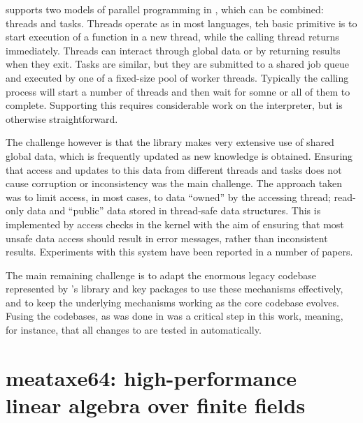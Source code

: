 \documentclass{deliverablereport}
\begin{document}
\HPCGAP supports two models of parallel programming in \GAP, which can
be combined: threads and tasks. Threads operate as in most languages,
teh basic primitive is to start execution of a \GAP function in a new
thread, while the calling thread returns immediately. Threads can
interact through global data or by returning results when they exit. Tasks are
similar, but they are submitted to a shared job queue and executed by
one of a fixed-size pool of worker threads. Typically the calling
process will start a number of threads and then wait for somne or all
of them to complete.  Supporting this requires considerable work on
the \GAP interpreter, but is otherwise straightforward.

The challenge
however is that the \GAP library makes very extensive use of shared
global data, which is frequently updated as new knowledge is
obtained. Ensuring that access and updates to this data from different
threads and tasks does not cause corruption or inconsistency was the
main challenge. The approach taken was to limit access, in most cases,
to data ``owned'' by the accessing thread; read-only data and
``public'' data stored in thread-safe data structures. This is
implemented by access checks in the kernel with the aim of ensuring
that most unsafe data access should result in error messages, rather
than inconsistent results. Experiments with this system have been
reported in a number of papers.

The main remaining challenge is to adapt the enormous legacy codebase
represented by \GAP's library and key packages to use these mechanisms
effectively, and to keep the underlying mechanisms working as the core
\GAP codebase evolves. Fusing the codebases, as was done in 
was a critical step in this work, meaning, for instance, that all
changes to \GAP are tested in \HPCGAP automatically.





\section{meataxe64: high-performance linear algebra over finite fields}\label{meataxe64}
\end{document}

